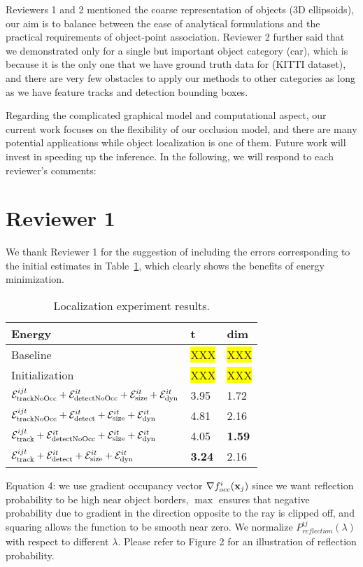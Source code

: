 \documentclass[10pt,twocolumn,letterpaper]{article}
\newcommand{\hili}[1]{\colorbox{yellow}{#1}}
\begin{document}
Reviewers 1 and 2 mentioned the coarse representation of objects (3D ellipsoids), our aim is to balance between the ease of analytical formulations and the practical requirements of object-point association. Reviewer 2 further said that we demonstrated only for a single but important object category (car), which is because it is the only one that we have ground truth data for (KITTI dataset), and there are very few obstacles to apply our methods to other categories as long as we have feature tracks and detection bounding boxes.

Regarding the complicated graphical model and computational aspect, our current work focuses on the flexibility of our occlusion model, and there are many potential applications while object localization is one of them. Future work will invest in speeding up the inference. In the following, we will respond to each reviewer's comments:

\section{Reviewer 1}

We thank Reviewer 1 for the suggestion of including the errors corresponding to the initial estimates in Table~\ref{tab:localization}, which clearly shows the benefits of energy minimization.   

\begin{table}\centering\footnotesize
\begin{tabular}{|l|l|l|}
\hline
Energy & t & dim \\
\hline
\hline
Baseline & \hili{XXX} & \hili{XXX} \\
Initialization & \hili{XXX} & \hili{XXX} \\
$\mathcal{E}^{ijt}_{\text{trackNoOcc}} + \mathcal{E}^{it}_{\text{detectNoOcc}} +\mathcal{E}^{it}_{\text{size}}+\mathcal{E}^{it}_{\text{dyn}}$ 
& 3.95  & 1.72\\        
$\mathcal{E}^{ijt}_{\text{trackNoOcc}} + \mathcal{E}^{it}_{\text{detect}} +\mathcal{E}^{it}_{\text{size}}+\mathcal{E}^{it}_{\text{dyn}}$        
& 4.81  & 2.16\\        
$\mathcal{E}^{ijt}_{\text{track}} + \mathcal{E}^{it}_{\text{detectNoOcc}} +\mathcal{E}^{it}_{\text{size}}+\mathcal{E}^{it}_{\text{dyn}}$      
& 4.05  & {\bf 1.59}\\        
$\mathcal{E}^{ijt}_{\text{track}} + \mathcal{E}^{it}_{\text{detect}} +\mathcal{E}^{it}_{\text{size}}+\mathcal{E}^{it}_{\text{dyn}}$             
& {\bf 3.24}  & 2.16\\
\hline
\end{tabular}
\caption{Localization experiment results.}
\label{tab:localization}
\end{table}

Equation 4: we use gradient occupancy vector $\nabla {f^i_{occ}}(\mathbf{x}_j)$ since we want reflection probability to be high near object borders, $\max$ ensures that negative probability due to gradient in the direction opposite to the ray is clipped off, and squaring allows the function to be smooth near zero. We normalize $P^{ij}_{\textit{reflection}}(\lambda)$  with respect to different $\lambda$. Please refer to Figure 2 for an illustration of reflection probability.
\end{document}
